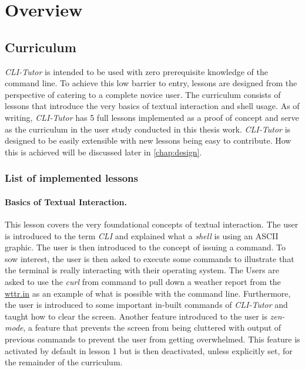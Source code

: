 \section{Overview}
\subsection{Curriculum}

\textit{CLI-Tutor} is intended to be used with zero prerequisite knowledge of
the command line. To achieve this low barrier to entry, lessons are designed
from the perspective of catering to a complete novice user. The curriculum
consists of lessons that introduce the very basics of textual interaction and
shell usage. As of writing, \textit{CLI-Tutor} has 5 full lessons implemented
as a proof of concept and serve as the curriculum in the user study conducted
in this thesis work. \textit{CLI-Tutor} is designed to be easily extensible
with new lessons being easy to contribute. How this is achieved will be
discussed later in \autoref{chap:design}.

\subsubsection{List of implemented lessons} 

\paragraph{Basics of Textual Interaction.} This lesson covers the very
foundational concepts of textual interaction. The user is introduced to the
term \textit{CLI} and explained what a \textit{shell} is using an ASCII
graphic. The user is then introduced to the concept of issuing a command. To
sow interest, the user is then asked to execute some commands to illustrate that
the terminal is really interacting with their operating system. The Users are
asked to use the \textit{curl} from command to pull down a weather report from
the \url{wttr.in} as an example of what is possible with the command line.
Furthermore, the user is introduced to some important in-built commands
of \textit{CLI-Tutor} and taught how to clear the screen. Another feature
introduced to the user is \textit{zen-mode}, a feature that prevents the screen
from being cluttered with output of previous commands to prevent the user from
getting overwhelmed. This feature is activated by default in lesson 1 but is
then deactivated, unless explicitly set, for the remainder of the curriculum.

